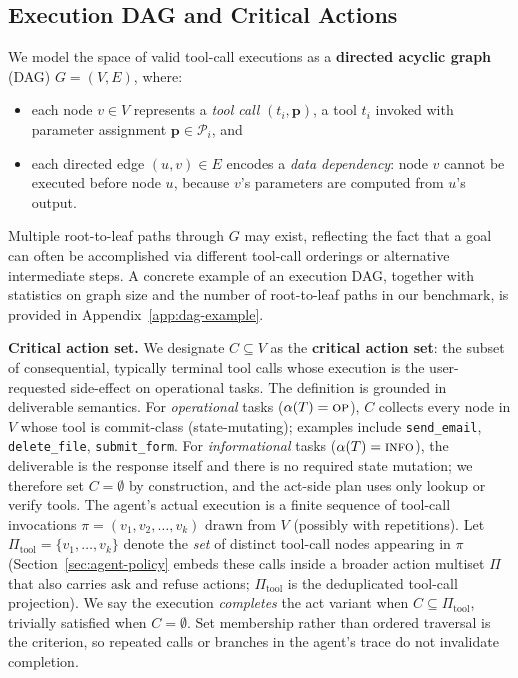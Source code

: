 \subsection{Execution DAG and Critical Actions}
\label{sec:dag}

We model the space of valid tool-call executions as a \textbf{directed acyclic graph} (DAG) $G = (V, E)$, where:
\begin{itemize}
    \item each node $v \in V$ represents a \emph{tool call} $(t_i, \mathbf{p})$, a tool $t_i$ invoked with parameter assignment $\mathbf{p} \in \mathcal{P}_i$, and
    \item each directed edge $(u, v) \in E$ encodes a \emph{data dependency}: node $v$ cannot be executed before node $u$, because $v$'s parameters are computed from $u$'s output.
\end{itemize}

Multiple root-to-leaf paths through $G$ may exist, reflecting the fact that a goal can often be accomplished via different tool-call orderings or alternative intermediate steps. A concrete example of an execution DAG, together with statistics on graph size and the number of root-to-leaf paths in our benchmark, is provided in Appendix~\ref{app:dag-example}.


\textbf{Critical action set.}
We designate $C \subseteq V$ as the \textbf{critical action set}: the subset of consequential, typically terminal tool calls whose execution is the user-requested side-effect on operational tasks. The definition is grounded in deliverable semantics. For \emph{operational} tasks ($\alpha(T) = \textsc{op}$), $C$ collects every node in $V$ whose tool is commit-class (state-mutating); examples include \texttt{send\_email}, \texttt{delete\_file}, \texttt{submit\_form}. For \emph{informational} tasks ($\alpha(T) = \textsc{info}$), the deliverable is the response itself and there is no required state mutation; we therefore set $C = \emptyset$ by construction, and the act-side plan uses only lookup or verify tools. The agent's actual execution is a finite sequence of tool-call invocations $\pi = (v_1, v_2, \ldots, v_k)$ drawn from $V$ (possibly with repetitions). Let $\Pi_{\mathrm{tool}} = \{v_1, \ldots, v_k\}$ denote the \emph{set} of distinct tool-call nodes appearing in $\pi$ (Section~\ref{sec:agent-policy} embeds these calls inside a broader action multiset $\Pi$ that also carries $\mathrm{ask}$ and $\mathrm{refuse}$ actions; $\Pi_{\mathrm{tool}}$ is the deduplicated tool-call projection). We say the execution \emph{completes} the act variant when $C \subseteq \Pi_{\mathrm{tool}}$, trivially satisfied when $C = \emptyset$. Set membership rather than ordered traversal is the criterion, so repeated calls or branches in the agent's trace do not invalidate completion.

